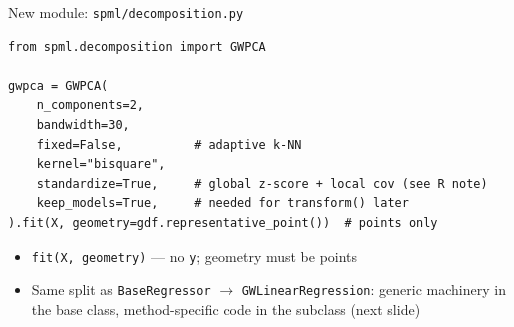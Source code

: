\documentclass[10pt]{beamer}
\begin{document}
\begin{frame}[fragile]{New module: \texttt{spml/decomposition.py}}
\begin{lstlisting}
from spml.decomposition import GWPCA

gwpca = GWPCA(
    n_components=2,
    bandwidth=30,
    fixed=False,          # adaptive k-NN
    kernel="bisquare",
    standardize=True,     # global z-score + local cov (see R note)
    keep_models=True,     # needed for transform() later
).fit(X, geometry=gdf.representative_point())  # points only
\end{lstlisting}
  \begin{itemize}
    \item \texttt{fit(X, geometry)} --- no \texttt{y}; geometry must be
      points
    \item Same split as \texttt{BaseRegressor} $\to$
      \texttt{GWLinearRegression}: generic machinery in the base class,
      method-specific code in the subclass (next slide)
  \end{itemize}
\end{frame}
\end{document}
